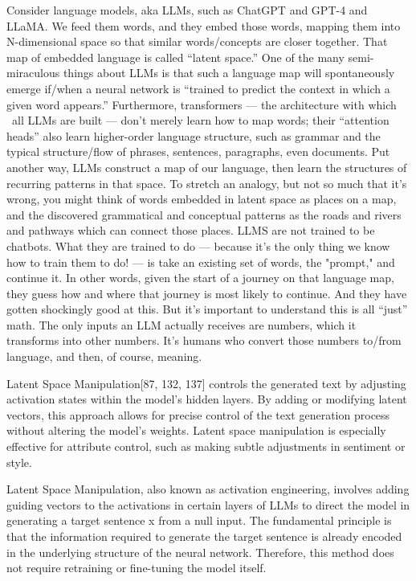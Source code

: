 Consider language models, aka LLMs, such as ChatGPT and GPT-4 and LLaMA. We feed them words, and they embed those words, mapping them into N-dimensional space so that similar words/concepts are closer together. 
That map of embedded language is called “latent space.”
One of the many semi-miraculous things about LLMs is that such a language map will spontaneously emerge if/when a neural network is “trained to predict the context in which a given word appears.”
Furthermore, transformers — the architecture with which ~all LLMs are built — don't merely learn how to map words; their “attention heads” also learn higher-order language structure, such as grammar and the typical structure/flow of phrases, sentences, paragraphs, even documents.
Put another way, LLMs construct a map of our language, then learn the structures of recurring patterns in that space. 
To stretch an analogy, but not so much that it's wrong, you might think of words embedded in latent space as places on a map, and the discovered grammatical and conceptual patterns as the roads and rivers and pathways which can connect those places. 
LLMS are not trained to be chatbots. What they are trained to do — because it's the only thing we know how to train them to do! — is take an existing set of words, the "prompt," and continue it. 
In other words, given the start of a journey on that language map, they guess how and where that journey is most likely to continue. 
And they have gotten shockingly good at this.
But it's important to understand this is all “just” math. The only inputs an LLM actually receives are numbers, which it transforms into other numbers. 
It's humans who convert those numbers to/from language, and then, of course, meaning.

Latent Space Manipulation[87, 132, 137] controls the generated text by adjusting activation states within the model's hidden layers. 
By adding or modifying latent vectors, this approach allows for precise control of the text generation process without altering the model's weights. 
Latent space manipulation is especially effective for attribute control, such as making subtle adjustments in sentiment or style.

Latent Space Manipulation, also known as activation engineering, involves adding guiding vectors to the activations in certain layers of LLMs to direct the model in generating a target sentence x from a null input. 
The fundamental principle is that the information required to generate the target sentence is already encoded in the underlying structure of the neural network. 
Therefore, this method does not require retraining or fine-tuning the model itself.


